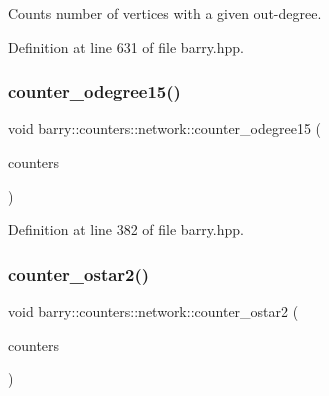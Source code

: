 Counts number of vertices with a given out-\/degree. 



Definition at line 631 of file barry.\+hpp.

\mbox{\label{namespacebarry_1_1counters_1_1network_af4ab196a242dd233010b342712fe0449}} 
\subsubsection{\texorpdfstring{counter\+\_\+odegree15()}{counter\_odegree15()}}
{\footnotesize\ttfamily void barry\+::counters\+::network\+::counter\+\_\+odegree15 (\begin{DoxyParamCaption}\item[{\hyperlink{namespacebarry_1_1counters_1_1network_aa72fdb34752ac24167a06ee196a8fff6}{Net\+Counters} $\ast$}]{counters }\end{DoxyParamCaption})\hspace{0.3cm}{\ttfamily [inline]}}



Definition at line 382 of file barry.\+hpp.

\mbox{\label{namespacebarry_1_1counters_1_1network_acbeff158b43d56c1fbf76f8c18891f9b}} 
\subsubsection{\texorpdfstring{counter\+\_\+ostar2()}{counter\_ostar2()}}
{\footnotesize\ttfamily void barry\+::counters\+::network\+::counter\+\_\+ostar2 (\begin{DoxyParamCaption}\item[{\hyperlink{namespacebarry_1_1counters_1_1network_aa72fdb34752ac24167a06ee196a8fff6}{Net\+Counters} $\ast$}]{counters }\end{DoxyParamCaption})\hspace{0.3cm}{\ttfamily [inline]}}



